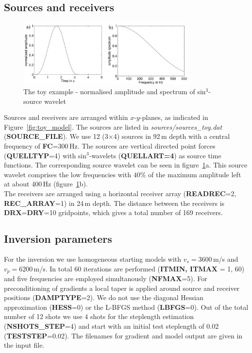 \subsection{Sources and receivers}
\begin{figure}[h!]
\begin{center}
\includegraphics[width=0.8\textwidth]{fig_toy/source_toy}
\caption[Toy example - source wavelet and spectrum]{The toy example - normalised amplitude and spectrum of sin$^3$-source wavelet }\label{fig:toy_wavelet}
\end{center}
\end{figure}
Sources and receivers are arranged within $x$-$y$-planes, as indicated in Figure~\ref{fig:toy_model}. The sources are listed in \textit{sources/sources\_toy.dat} (\textbf{SOURCE\_FILE}). We use 12 (3$\times$4) sources in 92\,m depth with a central frequency of \textbf{FC}=300\,Hz. The sources are vertical directed point forces (\textbf{QUELLTYP}=4) with sin$^3$-wavelets (\textbf{QUELLART=4}) as source time functions. The corresponding source wavelet can be seen in figure~\ref{fig:toy_wavelet}a. This source wavelet comprises the low frequencies with $40\%$ of the maximum amplitude left at about 400\,Hz (figure~\ref{fig:toy_wavelet}b). \\
The receivers are arranged using a horizontal receiver array (\textbf{READREC}=2, \textbf{REC\_ARRAY}=1) in 24\,m depth. The distance between the receivers is \textbf{DRX}=\textbf{DRY}=10 gridpoints, which gives a total number of 169 receivers. 
\subsection{Inversion parameters}
For the inversion we use homogeneous starting models with $v_s=3600$\,m/s and $v_p=6200$\,m/s. In total 60 iterations are performed (\textbf{ITMIN, ITMAX }= 1, 60) and five frequencies are employed simultanously (\textbf{NFMAX}=5). For preconditioning of gradients a local taper is applied around source and receiver positions (\textbf{DAMPTYPE}=2). We do not use the diagonal Hessian approximation (\textbf{HESS}=0) or the L-BFGS method (\textbf{LBFGS}=0). Out of the total number of 12 shots we use 4 shots for the steplength estimation (\textbf{NSHOTS\_STEP}=4) and start with an initial test steplength of 0.02 (\textbf{TESTSTEP}=0.02). The filenames for gradient and model output are given in the input file.
